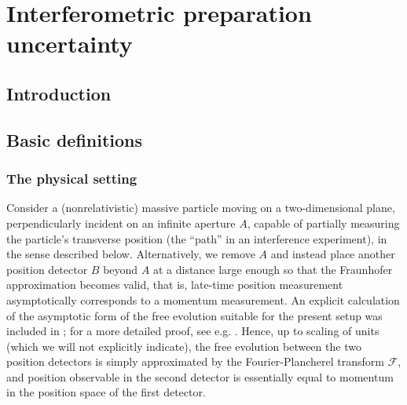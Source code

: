 \chapter{Interferometric preparation uncertainty}\label{chap:interferometric_prep_ur}

\section{Introduction} 


\section{Basic definitions}

\subsection{The physical setting}

Consider a (nonrelativistic) massive particle moving on a two-dimensional plane, perpendicularly incident on an infinite aperture $A$, capable of partially measuring the particle's transverse position (the ``path'' in an interference experiment), in the sense described below. Alternatively, we remove $A$ and instead place another position detector $B$ beyond $A$ at a distance large 
enough so that the Fraunhofer approximation becomes valid, that is, late-time position measurement asymptotically corresponds to a momentum measurement. An explicit calculation of the asymptotic form of the free evolution suitable for the present setup was included in \cite{BB2013}; for a more detailed proof, see e.g. \cite[Theorem IX.31]{RSII}. Hence, up to scaling of units (which we will not explicitly indicate), the free evolution between the two position detectors is simply approximated by the Fourier-Plancherel transform $\mathcal F$, and position observable in the second detector is essentially equal to momentum in the position space of the first detector.

